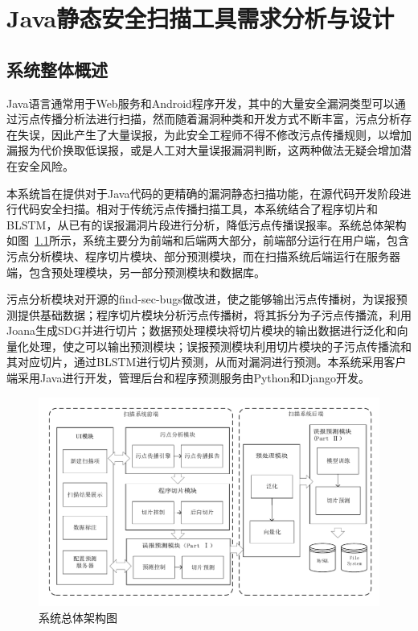 \chapter{Java静态安全扫描工具需求分析与设计}
\section{系统整体概述}
Java语言通常用于Web服务和Android程序开发，其中的大量安全漏洞类型可以通过污点传播分析法进行扫描，然而随着漏洞种类和开发方式不断丰富，污点分析存在失误，因此产生了大量误报，为此安全工程师不得不修改污点传播规则，以增加漏报为代价换取低误报，或是人工对大量误报漏洞判断，这两种做法无疑会增加潜在安全风险。

本系统旨在提供对于Java代码的更精确的漏洞静态扫描功能，在源代码开发阶段进行代码安全扫描。相对于传统污点传播扫描工具，本系统结合了程序切片和BLSTM，从已有的误报漏洞片段进行分析，降低污点传播误报率。系统总体架构如图~\ref{overview}所示，系统主要分为前端和后端两大部分，前端部分运行在用户端，包含污点分析模块、程序切片模块、部分预测模块，而在扫描系统后端运行在服务器端，包含预处理模块，另一部分预测模块和数据库。

污点分析模块对开源的find-sec-bugs做改进，使之能够输出污点传播树，为误报预测提供基础数据；程序切片模块分析污点传播树，将其拆分为子污点传播流，利用Joana生成SDG并进行切片；数据预处理模块将切片模块的输出数据进行泛化和向量化处理，使之可以输出预测模块；误报预测模块利用切片模块的子污点传播流和其对应切片，通过BLSTM进行切片预测，从而对漏洞进行预测。本系统采用客户端采用Java进行开发，管理后台和程序预测服务由Python和Django开发。

\begin{figure}[htb]
	\centering
	\includegraphics[width=5in]{FIGs/chapter3/system-architecture.pdf}
	\caption{系统总体架构图}\label{overview}
\end{figure}

